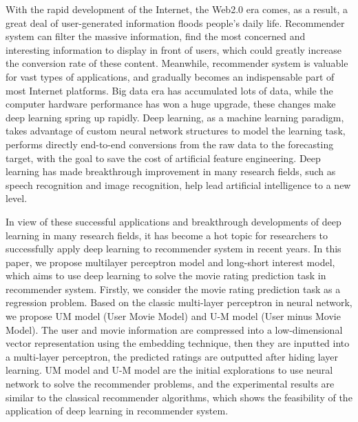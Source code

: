 \begin{eabstract}
With the rapid development of the Internet, the Web2.0 era comes, as a result,
a great deal of user-generated information floods people's daily life.
Recommender system can filter the massive information, 
find the most concerned and interesting information to display in front of users,
which could greatly increase the conversion rate of these content.
Meanwhile, recommender system is valuable for vast types of applications,
and gradually becomes an indispensable part of most Internet platforms.
Big data era has accumulated lots of data, while the computer hardware performance has won a huge upgrade,
these changes make deep learning spring up rapidly. Deep learning, as a machine learning paradigm,
takes advantage of custom neural network structures to model the learning task,
performs directly end-to-end conversions from the raw data to the forecasting target,
with the goal to save the cost of artificial feature engineering.
Deep learning has made breakthrough improvement in many research fields,
such as speech recognition and image recognition, help lead artificial intelligence to a new level.

In view of these successful applications and breakthrough developments of deep learning in many research fields,
it has become a hot topic for researchers to successfully apply deep learning to recommender system in recent years.
In this paper, we propose multilayer perceptron model and long-short interest model,
which aims to use deep learning to solve the movie rating prediction task in recommender system.
Firstly, we consider the movie rating prediction task as a regression problem.
Based on the classic multi-layer perceptron in neural network,
we propose UM model (User Movie Model) and U-M model (User minus Movie Model).
The user and movie information are compressed into a low-dimensional vector representation using the embedding technique,
then they are inputted into a multi-layer perceptron, the predicted ratings are outputted after hiding layer learning.
UM model and U-M model are the initial explorations to use neural network to solve the recommender problems,
and the experimental results are similar to the classical recommender algorithms,
which shows the feasibility of the application of deep learning in recommender system.


\end{eabstract}
